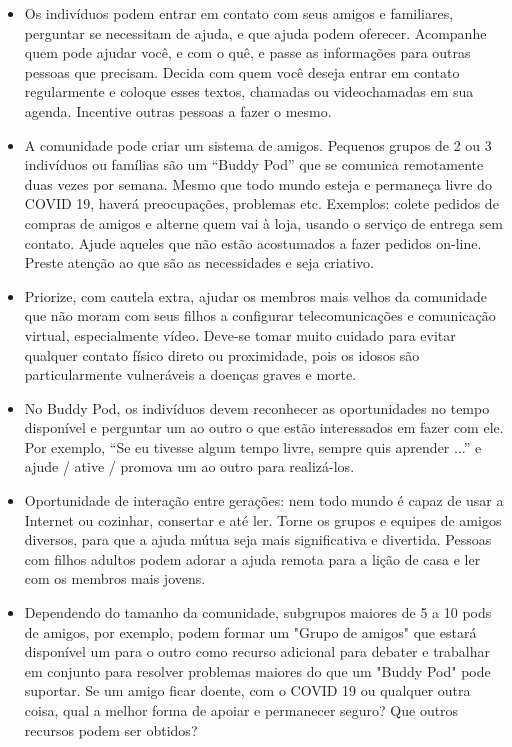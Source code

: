 \documentclass[onecolumn,journal]{IEEEtran}
\begin{document}
\begin{multicols}{2}
\begin{itemize}
    \item Os indivíduos podem entrar em contato com seus amigos e familiares, perguntar se necessitam de ajuda, e que ajuda podem oferecer. Acompanhe quem pode ajudar você, e com o quê, e passe as informações para outras pessoas que precisam. Decida com quem você deseja entrar em contato regularmente e coloque esses textos, chamadas ou videochamadas em sua agenda. Incentive outras pessoas a fazer o mesmo.
    \item A comunidade pode criar um sistema de amigos. Pequenos grupos de 2 ou 3 indivíduos ou famílias são um “Buddy Pod” que se comunica remotamente duas vezes por semana. Mesmo que todo mundo esteja e permaneça livre do COVID 19, haverá preocupações, problemas etc. Exemplos: colete pedidos de compras de amigos e alterne quem vai à loja, usando o serviço de entrega sem contato. Ajude aqueles que não estão acostumados a fazer pedidos on-line. Preste atenção ao que são as necessidades e seja criativo.
    \item Priorize, com cautela extra, ajudar os membros mais velhos da comunidade que não moram com seus filhos a configurar telecomunicações e comunicação virtual, especialmente vídeo. Deve-se tomar muito cuidado para evitar qualquer contato físico direto ou proximidade, pois os idosos são particularmente vulneráveis a doenças graves e morte.
    \item No Buddy Pod, os indivíduos devem reconhecer as oportunidades no tempo disponível e perguntar um ao outro o que estão interessados em fazer com ele. Por exemplo, “Se eu tivesse algum tempo livre, sempre quis aprender ...” e ajude / ative / promova um ao outro para realizá-los.
    \item Oportunidade de interação entre gerações: nem todo mundo é capaz de usar a Internet ou cozinhar, consertar e até ler. Torne os grupos e equipes de amigos diversos, para que a ajuda mútua seja mais significativa e divertida. Pessoas com filhos adultos podem adorar a ajuda remota para a lição de casa e ler com os membros mais jovens.
    \item Dependendo do tamanho da comunidade, subgrupos maiores de 5 a 10 pods de amigos, por exemplo, podem formar um "Grupo de amigos" que estará disponível um para o outro como recurso adicional para debater e trabalhar em conjunto para resolver problemas maiores do que um "Buddy Pod" pode suportar. Se um amigo ficar doente, com o COVID 19 ou qualquer outra coisa, qual a melhor forma de apoiar e permanecer seguro? Que outros recursos podem ser obtidos?

\end{itemize}
\end{multicols}
\end{document}
